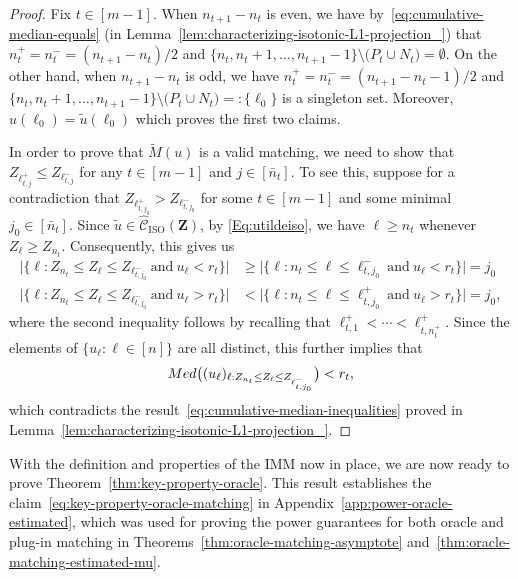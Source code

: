 \documentclass[12pt]{article}
\newcommand{\ISO}{\mathrm{ISO}}
\newcommand{\bZ}{\mathbf{Z}}
\begin{document}
\begin{proof}
    Fix $t\in [m-1]$. When $n_{t+1}-n_t$ is even, we have by~\eqref{eq:cumulative-median-equals} (in Lemma~\ref{lem:characterizing-isotonic-L1-projection_}) that $n_t^+=n_t^-=(n_{t+1}-n_t)/2$ and $\{n_t,n_t+1,\ldots,n_{t+1}-1\}\setminus \bigl(P_t\cup N_t\bigr)=\emptyset$.  On the other hand, when $n_{t+1}-n_t$ is odd, we have $n_t^+=n_t^-=(n_{t+1}-n_t-1)/2$ and $\{n_t,n_t+1,\ldots,n_{t+1}-1\}\setminus \bigl(P_t\cup N_t\bigr)=:\{\ell_0\}$ 
    is a singleton set. Moreover, $u(\ell_0)=\tilde{u}(\ell_0)$ which proves the first two claims.

    In order to prove that $\widetilde{M}(u)$ is a valid matching, we need to show that $Z_{\ell_{t,j}^+}\leq Z_{\ell_{t,j}^-}$ for any $t\in [m-1]$ and $j\in [\bar{n}_t]$.  To see this, suppose for a contradiction that $Z_{\ell_{t,j_0}^+}>Z_{\ell_{t,j_0}^-}$ for some $t \in [m-1]$ and some minimal $j_0 \in [\bar{n}_t]$. Since $\tilde{u}\in \widehat{\mathcal{C}}_\ISO(\bZ)$, by \eqref{Eq:utildeiso}, we have $\ell\geq n_t$ whenever $Z_\ell\geq Z_{n_t}$.
    Consequently, this gives us
     \begin{align*}
         \bigl|\{\ell:Z_{n_t}\leq Z_\ell\leq Z_{\ell_{t,j_0}^-}~\text{and}~u_\ell< r_t\}\bigr|&\geq \bigl|\{\ell:n_t\leq \ell\leq \ell_{t,j_0}^-~\text{and}~u_\ell < r_t\}\bigr|=j_0\\
         \bigl|\{\ell:Z_{n_t}\leq Z_\ell\leq Z_{\ell_{t,j_0}^-}~\text{and}~u_\ell> r_t\}\bigr|&< \bigl|\{\ell:n_t\leq \ell\leq \ell_{t,j_0}^+~\text{and}~u_\ell> r_t\}\bigr|=j_0,
     \end{align*}
     where the second inequality follows by recalling that $\ell_{t,1}^+<\cdots <\ell_{t,n_{t}^+}^+$.
     Since the elements of $\{u_\ell:\ell \in [n]\}$ are all distinct, this further implies that
   \[
   \textnormal{Med}\bigl((u_\ell)_{\ell:Z_{n_t}\leq Z_\ell\leq Z_{\ell_{t,j_0}^-}}\bigr) 
        < r_t,
    \]
    which contradicts the result~\eqref{eq:cumulative-median-inequalities} proved in Lemma~\ref{lem:characterizing-isotonic-L1-projection_}.
\end{proof}
With the definition and properties of the IMM now in place, we are now ready to prove Theorem~\ref{thm:key-property-oracle}. This result establishes the claim~\eqref{eq:key-property-oracle-matching} in Appendix~\ref{app:power-oracle-estimated}, which was used for proving the power guarantees for both oracle and plug-in matching in Theorems~\ref{thm:oracle-matching-asymptote} and~\ref{thm:oracle-matching-estimated-mu}.
\end{document}
